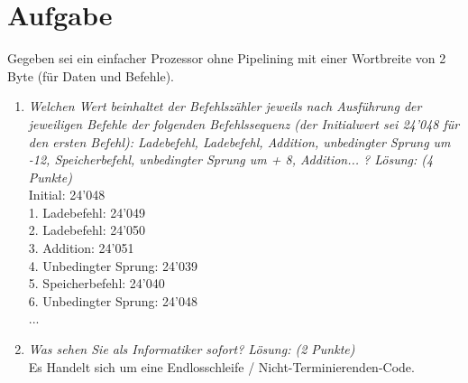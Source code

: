 \documentclass[10pt]{article}
\begin{document}
\section{Aufgabe}
Gegeben sei ein einfacher Prozessor ohne Pipelining mit einer Wortbreite von 2 Byte (für Daten und Befehle). 
\begin{enumerate}[label=\alph*)]
	\item 
	\textit{Welchen Wert beinhaltet der Befehlszähler jeweils nach Ausführung der jeweiligen Befehle der folgenden Befehlssequenz (der Initialwert sei 24'048 für den ersten Befehl): Ladebefehl, Ladebefehl, Addition, unbedingter Sprung um -12, Speicherbefehl, unbedingter Sprung um + 8, Addition... ? Lösung: (4 Punkte)} \\
	Initial: 24'048\\
	1. Ladebefehl: 24'049\\
	2. Ladebefehl: 24'050\\
	3. Addition: 24'051\\
	4. Unbedingter Sprung: 24'039 \\
	5. Speicherbefehl: 24'040\\
	6. Unbedingter Sprung: 24'048 \\
	...
	\item
	\textit{Was sehen Sie als Informatiker sofort? Lösung: (2 Punkte)} \\
	Es Handelt sich um eine Endlosschleife / Nicht-Terminierenden-Code.
		
\end{enumerate}


\end{document}
